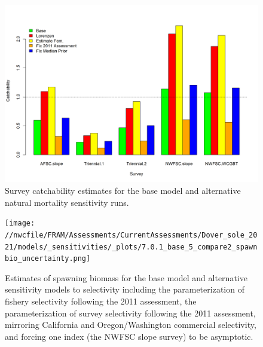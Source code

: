 \documentclass[11pt,
  english,
  a4paper,
]{article}
\begin{document}
\begin{figure}
\centering
\includegraphics[width=1\textwidth,height=1\textheight]{figs/SurveyQ_vs_M.png}
\caption{Survey catchability estimates for the base model and alternative natural mortality sensitivity runs.\label{fig:sens-m-survQ}}
\end{figure}

\tagmcend\tagstructend


\begin{figure}
\centering
\texttt{[image: //nwcfile/FRAM/Assessments/CurrentAssessments/Dover\_sole\_2021/models/\_sensitivities/\_plots/7.0.1\_base\_5\_compare2\_spawnbio\_uncertainty.png]}
\caption{Estimates of spawning biomass for the base model and alternative sensitivity models to selectivity including the parameterization of fishery selectivity following the 2011 assessment, the parameterization of survey selectivity following the 2011 assessment, mirroring California and Oregon/Washington commercial selectivity, and forcing one index (the NWFSC slope survey) to be asymptotic.\label{fig:sens-select-ssb}}
\end{figure}

\tagmcend\tagstructend
\end{document}
